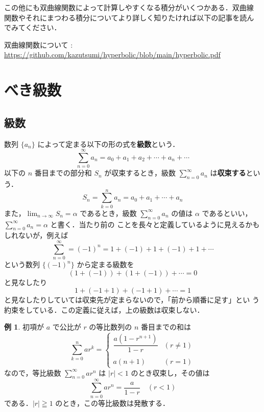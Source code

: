 \documentclass[10pt, uplatex, dvipdfmx]{jsarticle}
\theoremstyle{definition}
\newtheorem{example}[theorem]{例}
\numberwithin{equation}{section}
\newcommand{\ds}{\displaystyle}
\begin{document}
この他にも双曲線関数によって計算しやすくなる積分がいくつかある．双曲線
関数やそれにまつわる積分についてより詳しく知りたければ以下の記事を読ん
でみてください．
\begin{center}
  双曲線関数について : \url{https://github.com/kazutsumi/hyperbolic/blob/main/hyperbolic.pdf}
\end{center}

\newpage


\newpage

\section{べき級数}

\subsection{級数}

数列 $\{a_n\}$ によって定まる以下の形の式を\textbf{級数}という．
\[
  \sum_{n=0}^{\infty} a_n = a_0+a_1+a_2+ \cdots + a_n + \cdots
\]
以下の $n$ 番目までの部分和 $S_n$ が収束するとき，級数 $\ds
\sum_{n=0}^{\infty} a_n$ は\textbf{収束する}という．
\[
  S_n=\sum_{k=0}^{n}a_n = a_0 + a_1 + \cdots + a_n
\]
また，$\ds \lim_{n \to \infty} S_n = \alpha$ であるとき，級数
$\ds \sum_{n=0}^{\infty}a_n$ の値は $\alpha$
であるといい，$\ds \sum_{n=0}^{\infty} a_n = \alpha$ と書く．当たり前の
ことを長々と定義しているように見えるかもしれないが，例えば
\[
  \sum_{n=0}^{\infty} = (-1)^n = 1 +(-1) + 1 + (-1) + 1 + \cdots
\]
という数列 $\{(-1)^n\}$ から定まる級数を
\[
  \left( 1 + \left(-1\right)\right) + \left(1 + \left(-1\right)\right) + \cdots = 0
\]
と見なしたり
\[
  1 + \left(-1+1\right) + \left(-1+1\right) + \cdots =1
\]
と見なしたりしていては収束先が定まらないので，「前から順番に足す」とい
う約束をしている．この定義に従えば，上の級数は収束しない．

\begin{example}\label{exmp:geo-seq}
  初項が $a$ で公比が $r$ の等比数列の $n$ 番目までの和は
  \[
    \sum_{k=0}^{n}ar^{k} =
    \begin{cases}
      \dfrac{a(1-r^{n+1})}{1-r} & (r \neq 1)\\ \\
      a(n+1) & (r =1)
    \end{cases}
  \]
  なので，等比級数 $\ds \sum_{n=0}^{\infty} a r^{n}$ は $|r|<1$ のとき収束し，その値は
  \[
    \sum_{n=0}^{\infty} ar^{n} = \frac{a}{1-r} \quad (r <1)
  \]
  である．$|r|\geqq 1$ のとき，この等比級数は発散する．
\end{example}
\end{document}
